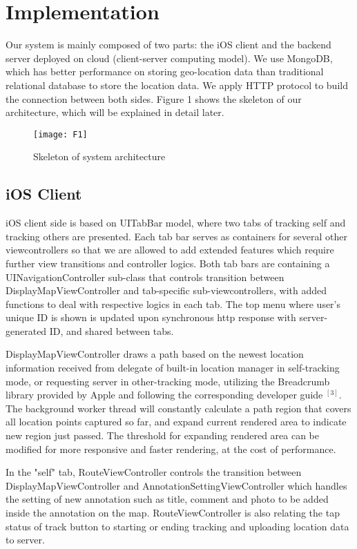 \documentclass[journal]{IEEEtran}
\begin{document}
\section{Implementation}
Our system is mainly composed of two parts: the iOS client and the backend server deployed on cloud (client-server computing model). We use MongoDB, which has better performance on storing geo-location data than traditional relational database to store the location data. We apply HTTP protocol to build the connection between both sides. Figure 1 shows the skeleton of our architecture, which will be explained in detail later.
\begin{figure}[h]
\centering
\texttt{[image: F1]}
\caption{Skeleton of system architecture}
\end{figure}

\subsection{iOS Client}
iOS client side is based on UITabBar model, where two tabs of tracking self and tracking others are presented. Each tab bar serves as containers for several other viewcontrollers so that we are allowed to add extended features which require further view transitions and controller logics. Both tab bars are containing a UINavigationController sub-class that controls transition between DisplayMapViewController and tab-specific sub-viewcontrollers, with added functions to deal with respective logics in each tab. The top menu where user's unique ID is shown is updated upon synchronous http response with server-generated ID, and shared between tabs.

DisplayMapViewController draws a path based on the newest location information received from delegate of built-in location manager in self-tracking mode, or requesting server in other-tracking mode, utilizing the Breadcrumb library provided by Apple and following the corresponding developer guide $^{[3]}$. The background worker thread will constantly calculate a path region that covers all location points captured so far, and expand current rendered area to indicate new region just passed. The threshold for expanding rendered area can be modified for more responsive and faster rendering, at the cost of performance.


In the "self" tab, RouteViewController controls the transition between DisplayMapViewController and AnnotationSettingViewController which handles the setting of new annotation such as title, comment and photo to be added inside the annotation on the map. RouteViewController is also relating the tap status of track button to starting or ending tracking and uploading location data to server.
\end{document}

